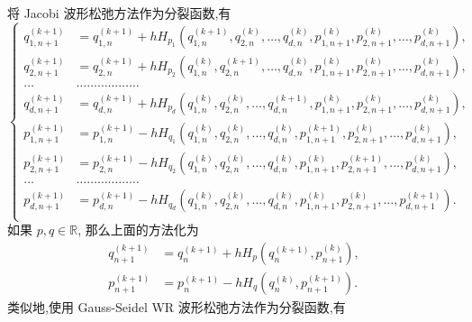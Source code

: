将 Jacobi 波形松弛方法作为分裂函数,有
\begin{equation*}
  \left\{
    \begin{aligned}
      q_{1,n+1}^{(k+1)}&=q_{1,n}^{(k+1)}+hH_{p_{1}}(q_{1,n}^{(k+1)},q_{2,n}^{(k)},\ldots,q_{d,n}^{(k)},p_{1,n+1}^{(k)},p_{2,n+1}^{(k)},\ldots,p_{d,n+1}^{(k)}),\\
      q_{2,n+1}^{(k+1)}&=q_{2,n}^{(k+1)}+hH_{p_{2}}(q_{1,n}^{(k)},q_{2,n}^{(k+1)},\ldots,q_{d,n}^{(k)},p_{1,n+1}^{(k)},p_{2,n+1}^{(k)},\ldots,p_{d,n+1}^{(k)}),\\
      \ldots&\ldots\ldots\ldots\ldots\ldots\ldots\\
      q_{d,n+1}^{(k+1)}&=q_{d,n}^{(k+1)}+hH_{p_{d}}(q_{1,n}^{(k)},q_{2,n}^{(k)},\ldots,q_{d,n}^{(k+1)},p_{1,n+1}^{(k)},p_{2,n+1}^{(k)},\ldots,p_{d,n+1}^{(k)}),\\
      p_{1,n+1}^{(k+1)}&=p_{1,n}^{(k+1)}-hH_{q_{1}}(q_{1,n}^{(k)},q_{2,n}^{(k)},\ldots,q_{d,n}^{(k)},p_{1,n+1}^{(k+1)},p_{2,n+1}^{(k)},\ldots,p_{d,n+1}^{(k)}),\\
      p_{2,n+1}^{(k+1)}&=p_{2,n}^{(k+1)}-hH_{q_{2}}(q_{1,n}^{(k)},q_{2,n}^{(k)},\ldots,q_{d,n}^{(k)},p_{1,n+1}^{(k)},p_{2,n+1}^{(k+1)},\ldots,p_{d,n+1}^{(k)}),\\
      \ldots&\ldots\ldots\ldots\ldots\ldots\ldots\\
      p_{d,n+1}^{(k+1)}&=p_{d,n}^{(k+1)}-hH_{q_{d}}(q_{1,n}^{(k)},q_{2,n}^{(k)},\ldots,q_{d,n}^{(k)},p_{1,n+1}^{(k)},p_{2,n+1}^{(k)},\ldots,p_{d,n+1}^{(k+1)}).\\
    \end{aligned}
  \right.
\end{equation*}
如果 $p,q \in \mathbb{R}$, 那么上面的方法化为
\begin{equation}\label{eq:schemejacobi}
  \begin{aligned}
    q_{n+1}^{(k+1)}&=q_{n}^{(k+1)}+hH_{p}(q_{n}^{(k+1)},p_{n+1}^{(k)}),\\
    p_{n+1}^{(k+1)}&=p_{n}^{(k+1)}-hH_{q}(q_{n}^{(k)},p_{n+1}^{(k+1)}).
  \end{aligned}
\end{equation}
类似地,使用 Gauss-Seidel WR 波形松弛方法作为分裂函数,有

